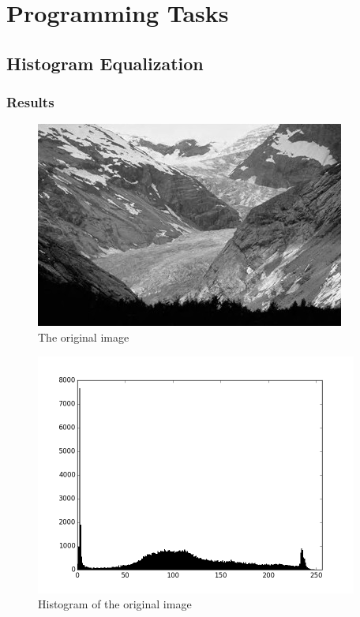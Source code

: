 \documentclass{article}
\begin{document}
\section{Programming Tasks}
\subsection{Histogram Equalization}
\subsubsection{Results}
\begin{figure}[H]
	\centering
	\includegraphics[width=288pt]{../img/02.png}
	\caption{The original image}
\end{figure}

\begin{figure}[H]
	\centering
	\includegraphics[width=300pt]{../result/hist.png}
	\caption{Histogram of the original image}
\end{figure}
\end{document}
